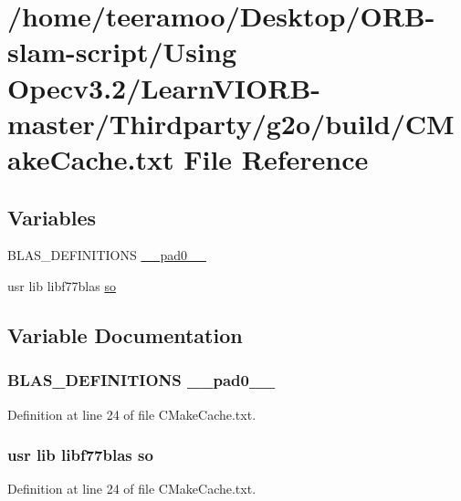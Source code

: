 \hypertarget{CMakeCache_8txt}{}\section{/home/teeramoo/\+Desktop/\+O\+R\+B-\/slam-\/script/\+Using Opecv3.2/\+Learn\+V\+I\+O\+R\+B-\/master/\+Thirdparty/g2o/build/\+C\+Make\+Cache.txt File Reference}
\label{CMakeCache_8txt}
\subsection*{Variables}
\begin{DoxyCompactItemize}
\item 
B\+L\+A\+S\+\_\+\+D\+E\+F\+I\+N\+I\+T\+I\+O\+NS \hyperlink{CMakeCache_8txt_a0d1fe2964ab2994fec51354deebe31a7}{\+\_\+\+\_\+pad0\+\_\+\+\_\+}
\item 
usr lib libf77blas \hyperlink{CMakeCache_8txt_ab27efa40ebe196dd82bbbf3d911fe5ca}{so}
\end{DoxyCompactItemize}


\subsection{Variable Documentation}
\subsubsection[{\texorpdfstring{\+\_\+\+\_\+pad0\+\_\+\+\_\+}{__pad0__}}]{\setlength{\rightskip}{0pt plus 5cm}B\+L\+A\+S\+\_\+\+D\+E\+F\+I\+N\+I\+T\+I\+O\+NS \+\_\+\+\_\+pad0\+\_\+\+\_\+}\hypertarget{CMakeCache_8txt_a0d1fe2964ab2994fec51354deebe31a7}{}\label{CMakeCache_8txt_a0d1fe2964ab2994fec51354deebe31a7}


Definition at line 24 of file C\+Make\+Cache.\+txt.

\subsubsection[{\texorpdfstring{so}{so}}]{\setlength{\rightskip}{0pt plus 5cm}usr lib libf77blas so}\hypertarget{CMakeCache_8txt_ab27efa40ebe196dd82bbbf3d911fe5ca}{}\label{CMakeCache_8txt_ab27efa40ebe196dd82bbbf3d911fe5ca}


Definition at line 24 of file C\+Make\+Cache.\+txt.

